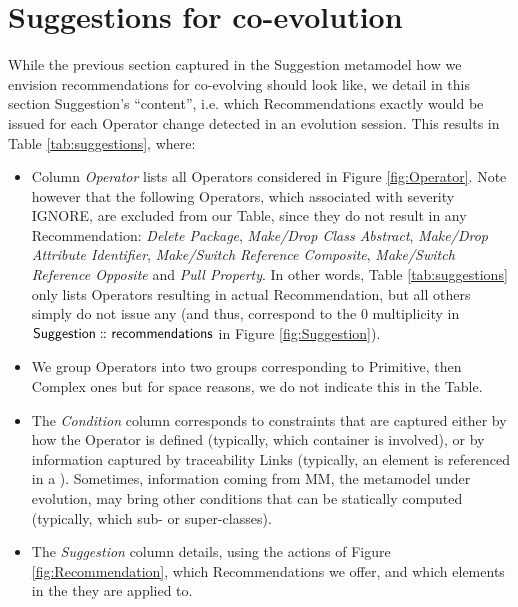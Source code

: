 \section{Suggestions for \viewtype co-evolution} 
\label{sec:Approach}


While the previous section captured in the \textsf{Suggestion} metamodel how we
envision recommendations for co-evolving \viewtypes should look like, we detail
in this section \textsf{Suggestion}'s ``content'', i.e. which \textsf{Recommendation}s
exactly would be issued for each \textsf{Operator} change detected in an evolution
session. This results in Table \ref{tab:suggestions}, where:
\begin{itemize}
	\item Column \textsl{Operator} lists all \textsf{Operator}s considered in Figure
	\ref{fig:Operator}. Note however that the following \textsf{Operator}s, which 
	associated with severity \textsf{IGNORE}, are excluded from our Table, since 
	they do not result in any \textsf{Recommendation}: \textit{Delete Package}, 
	\textit{Make/Drop Class Abstract}, \textit{Make/Drop Attribute Identifier}, 
	\textit{Make/Switch Reference Composite}, \textit{Make/Switch Reference Opposite}
	and \textit{Pull Property}. In other words, Table \ref{tab:suggestions} only
	lists \textsf{Operator}s resulting in actual \textsf{Recommendation}, but all
	others simply do not issue any (and thus, correspond to the \textsf{0} multiplicity
	in $\mathsf{Suggestion} \,\colon\!\!\!\colon \mathsf{recommendations}$ in Figure 
	\ref{fig:Suggestion}).
	
	\item We group \textsf{Operator}s into two groups corresponding to 
	\textsf{Primitive}, then \textsf{Complex} ones but for space reasons, we do not
	indicate this in the Table.
	
	\item The \textsl{Condition} column corresponds to constraints that are captured
	either by how the \textsf{Operator} is defined (typically, which \textsf{container}
	is involved), or by information captured by traceability \textsf{Link}s (typically,
	an element is referenced in a \viewtype). Sometimes, information coming from \textsf{MM},
	the metamodel under evolution, may bring other conditions that can be statically
	computed (typically, which sub- or super-classes). 
	
	\item The \textsl{Suggestion} column details, using the actions of Figure 
	\ref{fig:Recommendation}, which \textsf{Recommendation}s we offer, and which
	elements in the \viewtype they are applied to.
\end{itemize}



